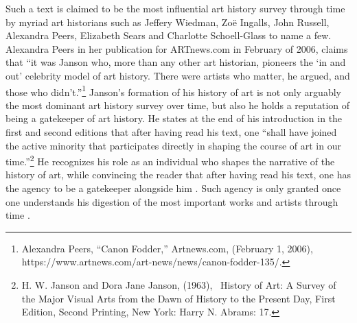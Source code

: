 \documentclass[
  letterpaper,
  DIV=11,
  numbers=noendperiod]{scrreprt}
\begin{document}
Such a text is claimed to be the most influential art history survey
through time by myriad art historians such as Jeffery Wiedman, Zoë
Ingalls, John Russell, Alexandra Peers, Elizabeth Sears and Charlotte
Schoell-Glass to name a few. Alexandra Peers in her publication for
ARTnews.com in February of 2006, claims that ``it was Janson who, more
than any other art historian, pioneers the `in and out' celebrity model
of art history. There were artists who matter, he argued, and those who
didn't.''\footnote{Alexandra Peers, ``Canon Fodder,'' Artnews.com,
  (February 1, 2006),
  https://www.artnews.com/art-news/news/canon-fodder-135/.} Janson's
formation of his history of art is not only arguably the most dominant
art history survey over time, but also he holds a reputation of being a
gatekeeper of art history. He states at the end of his introduction in
the first and second editions that after having read his text, one
``shall have joined the active minority that participates directly in
shaping the course of art in our time.''\footnote{H. W. Janson and Dora
  Jane Janson, (1963),~ History of Art: A Survey of the Major Visual
  Arts from the Dawn of History to the Present Day, First Edition,
  Second Printing, New York: Harry N. Abrams: 17.} He recognizes his
role as an individual who shapes the narrative of the history of art,
while convincing the reader that after having read his text, one has the
agency to be a gatekeeper alongside him . Such agency is only granted
once one understands his digestion of the most important works and
artists through time .
\end{document}
